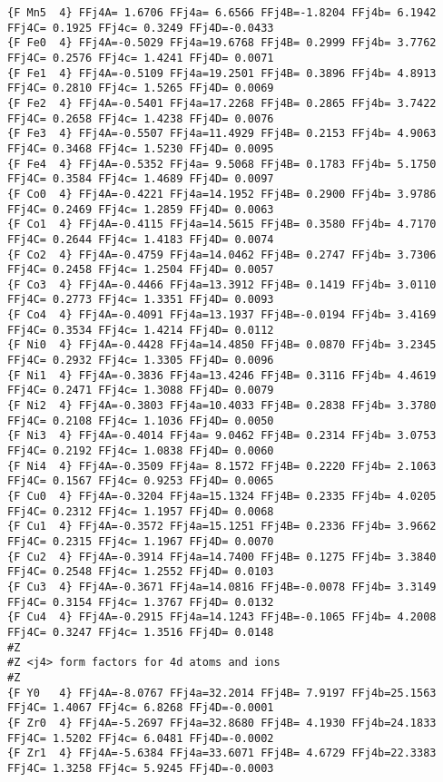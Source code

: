 {\begin{verbatim}
{F Mn5  4} FFj4A= 1.6706 FFj4a= 6.6566 FFj4B=-1.8204 FFj4b= 6.1942 FFj4C= 0.1925 FFj4c= 0.3249 FFj4D=-0.0433 
{F Fe0  4} FFj4A=-0.5029 FFj4a=19.6768 FFj4B= 0.2999 FFj4b= 3.7762 FFj4C= 0.2576 FFj4c= 1.4241 FFj4D= 0.0071 
{F Fe1  4} FFj4A=-0.5109 FFj4a=19.2501 FFj4B= 0.3896 FFj4b= 4.8913 FFj4C= 0.2810 FFj4c= 1.5265 FFj4D= 0.0069 
{F Fe2  4} FFj4A=-0.5401 FFj4a=17.2268 FFj4B= 0.2865 FFj4b= 3.7422 FFj4C= 0.2658 FFj4c= 1.4238 FFj4D= 0.0076 
{F Fe3  4} FFj4A=-0.5507 FFj4a=11.4929 FFj4B= 0.2153 FFj4b= 4.9063 FFj4C= 0.3468 FFj4c= 1.5230 FFj4D= 0.0095 
{F Fe4  4} FFj4A=-0.5352 FFj4a= 9.5068 FFj4B= 0.1783 FFj4b= 5.1750 FFj4C= 0.3584 FFj4c= 1.4689 FFj4D= 0.0097 
{F Co0  4} FFj4A=-0.4221 FFj4a=14.1952 FFj4B= 0.2900 FFj4b= 3.9786 FFj4C= 0.2469 FFj4c= 1.2859 FFj4D= 0.0063 
{F Co1  4} FFj4A=-0.4115 FFj4a=14.5615 FFj4B= 0.3580 FFj4b= 4.7170 FFj4C= 0.2644 FFj4c= 1.4183 FFj4D= 0.0074 
{F Co2  4} FFj4A=-0.4759 FFj4a=14.0462 FFj4B= 0.2747 FFj4b= 3.7306 FFj4C= 0.2458 FFj4c= 1.2504 FFj4D= 0.0057 
{F Co3  4} FFj4A=-0.4466 FFj4a=13.3912 FFj4B= 0.1419 FFj4b= 3.0110 FFj4C= 0.2773 FFj4c= 1.3351 FFj4D= 0.0093 
{F Co4  4} FFj4A=-0.4091 FFj4a=13.1937 FFj4B=-0.0194 FFj4b= 3.4169 FFj4C= 0.3534 FFj4c= 1.4214 FFj4D= 0.0112 
{F Ni0  4} FFj4A=-0.4428 FFj4a=14.4850 FFj4B= 0.0870 FFj4b= 3.2345 FFj4C= 0.2932 FFj4c= 1.3305 FFj4D= 0.0096 
{F Ni1  4} FFj4A=-0.3836 FFj4a=13.4246 FFj4B= 0.3116 FFj4b= 4.4619 FFj4C= 0.2471 FFj4c= 1.3088 FFj4D= 0.0079 
{F Ni2  4} FFj4A=-0.3803 FFj4a=10.4033 FFj4B= 0.2838 FFj4b= 3.3780 FFj4C= 0.2108 FFj4c= 1.1036 FFj4D= 0.0050 
{F Ni3  4} FFj4A=-0.4014 FFj4a= 9.0462 FFj4B= 0.2314 FFj4b= 3.0753 FFj4C= 0.2192 FFj4c= 1.0838 FFj4D= 0.0060 
{F Ni4  4} FFj4A=-0.3509 FFj4a= 8.1572 FFj4B= 0.2220 FFj4b= 2.1063 FFj4C= 0.1567 FFj4c= 0.9253 FFj4D= 0.0065 
{F Cu0  4} FFj4A=-0.3204 FFj4a=15.1324 FFj4B= 0.2335 FFj4b= 4.0205 FFj4C= 0.2312 FFj4c= 1.1957 FFj4D= 0.0068 
{F Cu1  4} FFj4A=-0.3572 FFj4a=15.1251 FFj4B= 0.2336 FFj4b= 3.9662 FFj4C= 0.2315 FFj4c= 1.1967 FFj4D= 0.0070 
{F Cu2  4} FFj4A=-0.3914 FFj4a=14.7400 FFj4B= 0.1275 FFj4b= 3.3840 FFj4C= 0.2548 FFj4c= 1.2552 FFj4D= 0.0103 
{F Cu3  4} FFj4A=-0.3671 FFj4a=14.0816 FFj4B=-0.0078 FFj4b= 3.3149 FFj4C= 0.3154 FFj4c= 1.3767 FFj4D= 0.0132 
{F Cu4  4} FFj4A=-0.2915 FFj4a=14.1243 FFj4B=-0.1065 FFj4b= 4.2008 FFj4C= 0.3247 FFj4c= 1.3516 FFj4D= 0.0148 
#Z
#Z <j4> form factors for 4d atoms and ions
#Z
{F Y0   4} FFj4A=-8.0767 FFj4a=32.2014 FFj4B= 7.9197 FFj4b=25.1563 FFj4C= 1.4067 FFj4c= 6.8268 FFj4D=-0.0001 
{F Zr0  4} FFj4A=-5.2697 FFj4a=32.8680 FFj4B= 4.1930 FFj4b=24.1833 FFj4C= 1.5202 FFj4c= 6.0481 FFj4D=-0.0002 
{F Zr1  4} FFj4A=-5.6384 FFj4a=33.6071 FFj4B= 4.6729 FFj4b=22.3383 FFj4C= 1.3258 FFj4c= 5.9245 FFj4D=-0.0003 

\end{verbatim}}
